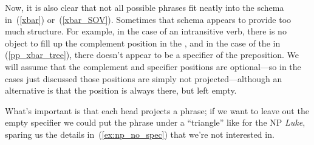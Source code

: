 \documentclass{article}
\begin{document}
Now, it is also clear that not all possible phrases fit neatly into the schema in~(\ref{xbar}) or~(\ref{xbar_SOV}).
Sometimes that schema appears to provide too much structure.
For example, in the case of an intransitive verb, there is no object to fill up the complement position in the , and in the case of the  in (\ref{pp_xbar_tree}), there doesn't appear to be a specifier of the preposition.
We will assume that the complement and specifier positions are optional---so in the cases just discussed those positions are simply not projected---although an alternative is that the position is always there, but left empty.%


\z

What's important is that each head projects a phrase; if we want to leave out the empty specifier we could put the phrase under a ``triangle'' like for the NP \emph{Luke}, sparing us the details in~(\ref{ex:np_no_spec}) that we're not interested in.

\begin{exe}
\begin{multicols}{2}
\columnbreak
         \label{ex:np_no_spec}
\end{multicols}
\end{exe}
\end{document}
